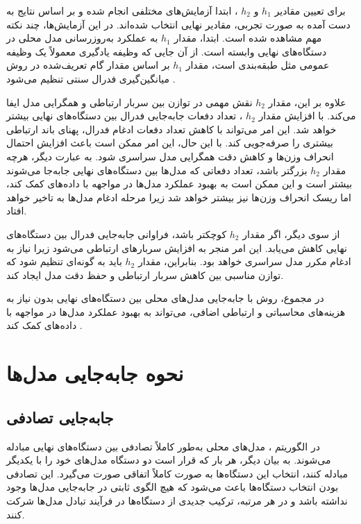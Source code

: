 برای تعیین مقادیر
$h_1$
و
$h_2$%
، ابتدا آزمایش‌های مختلفی انجام شده و بر اساس نتایج به دست آمده به صورت تجربی، مقادیر نهایی انتخاب شده‌اند. در این آزمایش‌ها، چند نکته مهم مشاهده شده است. ابتدا، مقدار
$h_1$
به عملکرد به‌روزرسانی مدل محلی در دستگاه‌های نهایی وابسته است. از آن‌ جایی که وظیفه یادگیری معمولاً یک وظیفه عمومی مثل طبقه‌بندی است، مقدار
$h_1$
بر اساس مقدار گام تعریف‌شده در روش میانگین‌گیری فدرال سنتی تنظیم می‌شود
\cite{chiu2020semisupervised}.

علاوه بر این، مقدار
$h_2$
نقش مهمی در توازن بین سربار ارتباطی و همگرایی مدل ایفا می‌کند. با افزایش مقدار
$h_2$%
، تعداد دفعات جابه‌جایی فدرال بین دستگاه‌های نهایی بیشتر خواهد شد. این امر می‌تواند با کاهش تعداد دفعات ادغام فدرال، پهنای باند ارتباطی بیشتری را صرفه‌جویی کند. با این حال، این امر ممکن است باعث افزایش احتمال انحراف وزن‌ها و کاهش دقت همگرایی مدل سراسری شود. به عبارت دیگر، هرچه مقدار
$h_2$
بزرگتر باشد، تعداد دفعاتی که مدل‌ها بین دستگاه‌های نهایی جابه‌جا می‌شوند بیشتر است و این ممکن است به بهبود عملکرد مدل‌ها در مواجهه با داده‌های
کمک کند، اما ریسک انحراف وزن‌ها نیز بیشتر خواهد شد زیرا مرحله ادغام مدل‌ها به تاخیر خواهد افتاد.

از سوی دیگر، اگر مقدار
$h_2$
کوچکتر باشد، فراوانی جابه‌جایی فدرال بین دستگاه‌های نهایی کاهش می‌یابد. این امر منجر به افزایش سربارهای ارتباطی می‌شود زیرا نیاز به ادغام مکرر مدل سراسری خواهد بود. بنابراین، مقدار
$h_2$
باید به گونه‌ای تنظیم شود که توازن مناسبی بین کاهش سربار ارتباطی و حفظ دقت مدل ایجاد کند.

در مجموع، روش
با جابه‌جایی مدل‌های محلی بین دستگاه‌های نهایی بدون نیاز به هزینه‌های محاسباتی و ارتباطی اضافی، می‌تواند به بهبود عملکرد مدل‌ها در مواجهه با داده‌های
کمک کند
\cite{chiu2020semisupervised}.



\section{نحوه جابه‌جایی مدل‌ها}
\subsection{جابه‌جایی تصادفی}

در الگوریتم
%
، مدل‌های محلی به‌طور کاملاً تصادفی بین دستگاه‌های نهایی مبادله می‌شوند. به بیان دیگر، هر بار که قرار است دو دستگاه مدل‌های خود را با یکدیگر مبادله کنند، انتخاب این دستگاه‌ها به صورت کاملاً اتفاقی صورت می‌گیرد. این تصادفی بودن انتخاب دستگاه‌ها باعث می‌شود که هیچ الگوی ثابتی در جابه‌جایی مدل‌ها وجود نداشته باشد و در هر مرتبه، ترکیب جدیدی از دستگاه‌ها در فرآیند تبادل مدل‌ها شرکت کنند.



